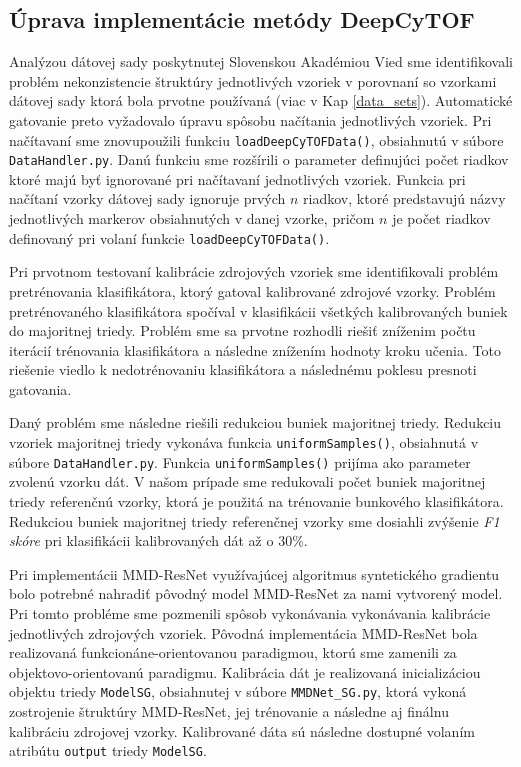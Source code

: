 \subsection{Úprava implementácie metódy DeepCyTOF}

Analýzou dátovej sady poskytnutej Slovenskou Akadémiou Vied sme identifikovali problém nekonzistencie štruktúry jednotlivých vzoriek v porovnaní so vzorkami dátovej sady ktorá bola prvotne používaná (viac v Kap \ref{data_sets}). Automatické gatovanie preto vyžadovalo úpravu spôsobu načítania jednotlivých vzoriek. Pri načítavaní sme znovupoužili funkciu \texttt{loadDeepCyTOFData()}, obsiahnutú v súbore \texttt{DataHandler.py}. Danú funkciu sme rozšírili o parameter definujúci počet riadkov ktoré majú byť ignorované pri načítavaní jednotlivých vzoriek. Funkcia pri načítaní vzorky dátovej sady ignoruje prvých $n$ riadkov, ktoré predstavujú názvy jednotlivých markerov obsiahnutých v danej vzorke, pričom $n$ je počet riadkov definovaný pri volaní funkcie \texttt{loadDeepCyTOFData()}.

Pri prvotnom testovaní kalibrácie zdrojových vzoriek sme identifikovali problém pretrénovania klasifikátora, ktorý gatoval kalibrované zdrojové vzorky. Problém pretrénovaného klasifikátora spočíval v klasifikácii všetkých kalibrovaných buniek do majoritnej triedy. Problém sme sa prvotne rozhodli riešiť zníženim počtu iterácií trénovania klasifikátora a následne znížením hodnoty kroku učenia. Toto riešenie viedlo k nedotrénovaniu klasifikátora a následnému poklesu presnoti gatovania.

Daný problém sme následne riešili redukciou buniek majoritnej triedy. Redukciu vzoriek majoritnej triedy vykonáva funkcia \texttt{uniformSamples()}, obsiahnutá v súbore \texttt{DataHandler.py}. Funkcia \texttt{uniformSamples()} prijíma ako parameter zvolenú vzorku dát. V našom prípade sme redukovali počet buniek majoritnej triedy referenčnú vzorky, ktorá je použitá na trénovanie bunkového klasifikátora. Redukciou buniek majoritnej triedy referenčnej vzorky sme dosiahli zvýšenie \textit{F1 skóre} pri klasifikácii kalibrovaných dát až o 30\%.

Pri implementácii MMD-ResNet využívajúcej algoritmus syntetického gradientu bolo potrebné nahradiť pôvodný model MMD-ResNet za nami vytvorený model. Pri tomto probléme sme pozmenili spôsob vykonávania vykonávania kalibrácie jednotlivých zdrojových vzoriek. Pôvodná implementácia MMD-ResNet bola realizovaná funkcionáne-orientovanou paradigmou, ktorú sme zamenili za objektovo-orientovanú paradigmu. Kalibrácia dát je realizovaná inicializáciou objektu triedy \texttt{ModelSG}, obsiahnutej v súbore \texttt{MMDNet_SG.py}, ktorá vykoná zostrojenie štruktúry MMD-ResNet, jej trénovanie a následne aj finálnu kalibráciu zdrojovej vzorky. Kalibrované dáta sú následne dostupné volaním atribútu \texttt{output} triedy \texttt{ModelSG}.

